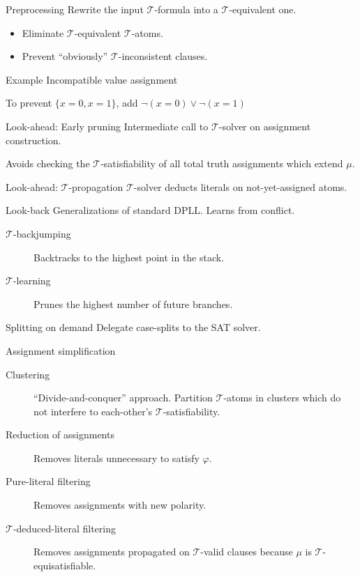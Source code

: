 \documentclass{beamer}
\begin{document}
\begin{frame}{Preprocessing}
  Rewrite the input $\mathcal{T}$-formula into a $\mathcal{T}$-equivalent one.

  \begin{itemize}
    \item Eliminate $\mathcal{T}$-equivalent $\mathcal{T}$-atoms.
    \item Prevent ``obviously'' $\mathcal{T}$-inconsistent clauses.
  \end{itemize}

  \begin{exampleblock}{Example}
    Incompatible value assignment

    To prevent $\{x=0, x=1\}$, add $\neg (x=0) \lor \neg (x=1)$
  \end{exampleblock}
\end{frame}

\begin{frame}{Look-ahead: Early pruning}
  Intermediate call to $\mathcal{T}$-solver on assignment construction.

  Avoids checking the $\mathcal{T}$-satisfiability of all total truth assignments which extend $\mu$.
\end{frame}

\begin{frame}{Look-ahead: $\mathcal{T}$-propagation}
  $\mathcal{T}$-solver deducts literals on not-yet-assigned atoms.
\end{frame}

\begin{frame}{Look-back}
  Generalizations of standard DPLL. Learns from conflict.
  \begin{description}
    \item[$\mathcal{T}$-backjumping] Backtracks to the highest point in the stack.
    \item[$\mathcal{T}$-learning] Prunes the highest number of future branches.
  \end{description}
\end{frame}

\begin{frame}{Splitting on demand}
  Delegate case-splits to the SAT solver.
\end{frame}

\begin{frame}{Assignment simplification}
  \begin{description}
    \item[Clustering] ``Divide-and-conquer'' approach. Partition $\mathcal{T}$-atoms in clusters which do not interfere to each-other's $\mathcal{T}$-satisfiability.
    \item[Reduction of assignments] Removes literals unnecessary to satisfy $\varphi$.
    \item[Pure-literal filtering] Removes assignments with new polarity.
    \item[$\mathcal{T}$-deduced-literal filtering] Removes assignments propagated on $\mathcal{T}$-valid clauses because $\mu$ is $\mathcal{T}$-equisatisfiable.
  \end{description}
\end{frame}
\end{document}
